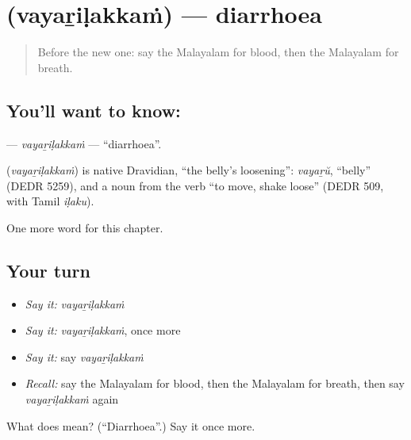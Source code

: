 \section[\texorpdfstring{\ml{വയറിളക്കം} (vayaṟiḷakkaṁ)}{വയറിളക്കം (vayaṟiḷakkaṁ)}]{ (vayaṟiḷakkaṁ) — diarrhoea}

\label{lesson:ML-C233-vayarilakkam}



\begin{quote}
Before the new one: say the Malayalam for blood, then the Malayalam for breath.
\end{quote}

\subsection*{You'll want to know: }
\textbf{} — \emph{vayaṟiḷakkaṁ} — \textquotedblleft{}diarrhoea\textquotedblright{}.

\begin{cousinweb}
\textbf{} (\emph{vayaṟiḷakkaṁ}) is native Dravidian, \textquotedblleft{}the belly's loosening\textquotedblright{}: \emph{vayaṟŭ}, \textquotedblleft{}belly\textquotedblright{} (DEDR 5259), and a noun from the verb \textquotedblleft{}to move, shake loose\textquotedblright{} (DEDR 509, with Tamil \emph{iḷaku}).
\end{cousinweb}

\begin{grammarlens}[title={What you've built}]
One more word for this chapter.
\end{grammarlens}

\subsection*{Your turn}
\begin{itemize}
\raggedright
  \item \emph{Say it:} \emph{vayaṟiḷakkaṁ}
  \item \emph{Say it:} \emph{vayaṟiḷakkaṁ}, once more
  \item \emph{Say it:} say \emph{vayaṟiḷakkaṁ}
  \item \emph{Recall:} say the Malayalam for blood, then the Malayalam for breath, then say \emph{vayaṟiḷakkaṁ} again
\end{itemize}

\begin{tcolorbox}[breakable,colback=teal!4,colframe=teal!35!black,title={Before you move on}]
What does  mean? (\textquotedblleft{}Diarrhoea\textquotedblright{}.) Say it once more.
\end{tcolorbox}
